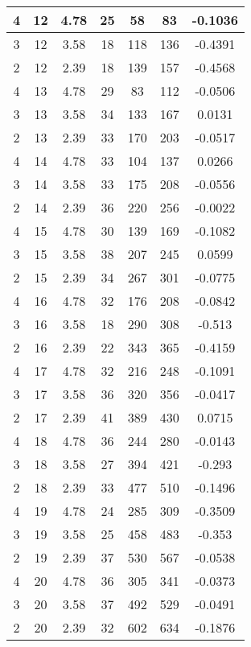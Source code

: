 \documentclass[letterpaper, 12pt]{article}
\begin{document}
\begin{longtable}{|c|c|c|c|c|c|c|}
\hline
4 & 12 & 4.78 & 25 & 58 & 83 & -0.1036 \\
\hline
3 & 12 & 3.58 & 18 & 118 & 136 & -0.4391 \\
\hline
2 & 12 & 2.39 & 18 & 139 & 157 & -0.4568 \\
\hline
4 & 13 & 4.78 & 29 & 83 & 112 & -0.0506 \\
\hline
3 & 13 & 3.58 & 34 & 133 & 167 & 0.0131 \\
\hline
2 & 13 & 2.39 & 33 & 170 & 203 & -0.0517 \\
\hline
4 & 14 & 4.78 & 33 & 104 & 137 & 0.0266 \\
\hline
3 & 14 & 3.58 & 33 & 175 & 208 & -0.0556 \\
\hline
2 & 14 & 2.39 & 36 & 220 & 256 & -0.0022 \\
\hline
4 & 15 & 4.78 & 30 & 139 & 169 & -0.1082 \\
\hline
3 & 15 & 3.58 & 38 & 207 & 245 & 0.0599 \\
\hline
2 & 15 & 2.39 & 34 & 267 & 301 & -0.0775 \\
\hline
4 & 16 & 4.78 & 32 & 176 & 208 & -0.0842 \\
\hline
3 & 16 & 3.58 & 18 & 290 & 308 & -0.513 \\
\hline
2 & 16 & 2.39 & 22 & 343 & 365 & -0.4159 \\
\hline
4 & 17 & 4.78 & 32 & 216 & 248 & -0.1091 \\
\hline
3 & 17 & 3.58 & 36 & 320 & 356 & -0.0417 \\
\hline
2 & 17 & 2.39 & 41 & 389 & 430 & 0.0715 \\
\hline
4 & 18 & 4.78 & 36 & 244 & 280 & -0.0143 \\
\hline
3 & 18 & 3.58 & 27 & 394 & 421 & -0.293 \\
\hline
2 & 18 & 2.39 & 33 & 477 & 510 & -0.1496 \\
\hline
4 & 19 & 4.78 & 24 & 285 & 309 & -0.3509 \\
\hline
3 & 19 & 3.58 & 25 & 458 & 483 & -0.353 \\
\hline
2 & 19 & 2.39 & 37 & 530 & 567 & -0.0538 \\
\hline
4 & 20 & 4.78 & 36 & 305 & 341 & -0.0373 \\
\hline
3 & 20 & 3.58 & 37 & 492 & 529 & -0.0491 \\
\hline
2 & 20 & 2.39 & 32 & 602 & 634 & -0.1876 \\
\hline
\end{longtable}
\end{document}
